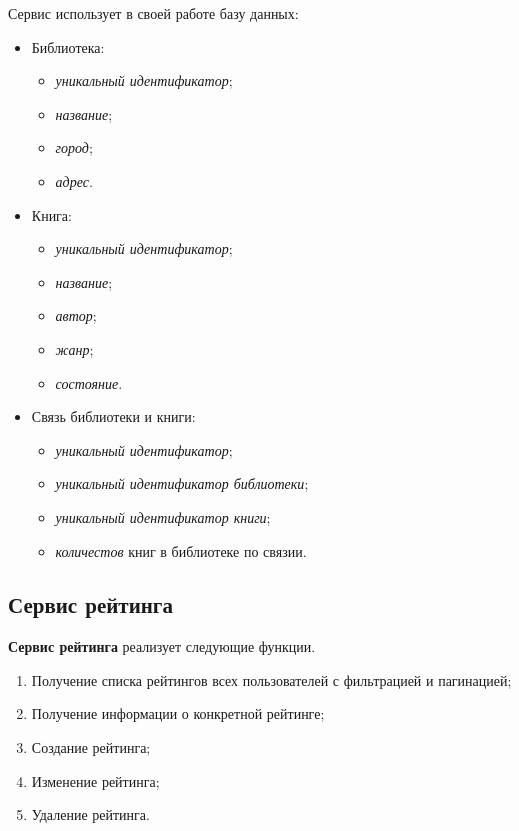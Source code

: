 Сервис использует в своей работе базу данных:
\begin{itemize}
  \item Библиотека:
  \begin{itemize}
    \item \textit{уникальный идентификатор};
    \item \textit{название};
    \item \textit{город};
    \item \textit{адрес}.
  \end{itemize}

  \item Книга:
  \begin{itemize}
    \item \textit{уникальный идентификатор};
    \item \textit{название};
    \item \textit{автор};
    \item \textit{жанр};
    \item \textit{состояние}.
  \end{itemize}

  \item Связь библиотеки и книги:
  \begin{itemize}
    \item \textit{уникальный идентификатор};
    \item \textit{уникальный идентификатор библиотеки};
    \item \textit{уникальный идентификатор книги};
    \item \textit{количестов} книг в библиотеке по связии.
  \end{itemize}
\end{itemize}


\subsection{Сервис рейтинга} \label{section:rating}

\textbf{Сервис рейтинга} реализует следующие функции.
\begin{enumerate}
	\item Получение списка рейтингов всех пользователей с фильтрацией и пагинацией;
	\item Получение информации о конкретной рейтинге;
	\item Создание рейтинга;
	\item Изменение рейтинга;
	\item Удаление рейтинга.
\end{enumerate}

